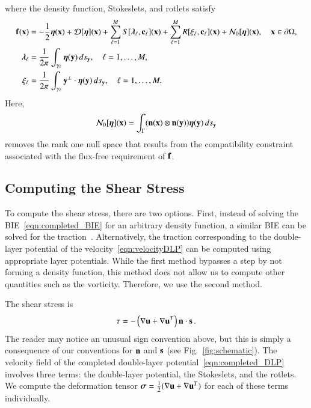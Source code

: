 \documentclass[preprint, 10pt]{elsarticle}
\begin{document}
where the density function, Stokeslets, and rotlets satisfy
\begin{subequations}
\label{eqn:completed_BIE}
\begin{align}
  \ff(\xx) &= -\frac{1}{2}\eeta(\xx) + \DD[\eeta](\xx) + 
      \sum_{\ell=1}^{M} S[\llambda_\ell,\cc_\ell](\xx) +
      \sum_{\ell=1}^{M} R[\xi_\ell,\cc_\ell](\xx) + \NN_0[\eeta](\xx),
      \quad \xx \in \bd\Omega, 
      \label{eqn:DLP}\\
  \llambda_\ell &= \frac{1}{2\pi}\int_{\gamma_\ell} \eeta(\yy) \, ds_\yy,
  \quad \ell=1,\ldots,M,
  \label{eqn:stokeslet} \\
  \xi_\ell &= \frac{1}{2\pi}\int_{\gamma_\ell} \yy^\perp \cdot \eeta(\yy)
  \, ds_\yy, \quad \ell=1,\ldots,M.
  \label{eqn:rotlet}
\end{align}
\end{subequations}
Here,
\begin{align*}
  \NN_0[\eeta](\xx) = \int_{\Gamma} 
    (\nn(\xx) \otimes \nn(\yy))\eeta(\yy) \, ds_\yy
\end{align*}
removes the rank one null space that results from the compatibility
constraint associated with the flux-free requirement of $\ff$.


\subsection{Computing the Shear Stress}
\label{sec:shearStressLP}
To compute the shear stress, there are two options.  First, instead of
solving the BIE~\eqref{eqn:completed_BIE} for an arbitrary density
function, a similar BIE can be solved for the
traction~\cite{mit-spa2016}.  Alternatively, the traction corresponding
to the double-layer potential of the velocity~\eqref{eqn:velocityDLP}
can be computed using appropriate layer potentials.  While the first
method bypasses a step by not forming a density function, this method
does not allow us to compute other quantities such as the vorticity.
Therefore, we use the second method.

The shear stress is
\begin{align*}
  \tau = -\left(\nabla \uu + \nabla \uu^T \right)\nn \cdot \ss \, .
\end{align*}
The reader may notice an unusual sign convention above, but this is simply a consequence of our conventions for $\nn$ and $\ss$ (see Fig.~\ref{fig:schematic}). 
The velocity field of the
completed double-layer potential~\eqref{eqn:completed_DLP} involves
three terms: the double-layer potential, the Stokeslets, and the
rotlets.  We compute the deformation tensor $\ssigma =
\frac{1}{2}(\nabla\uu + \nabla\uu^T)$ for each of these terms
individually.
\end{document}
